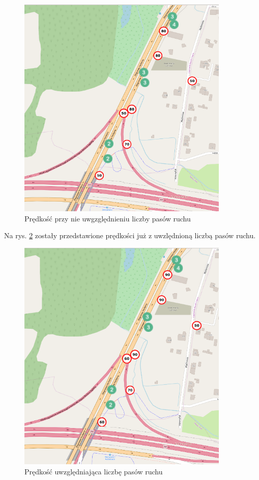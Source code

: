 \begin{figure}[h]
\caption{Prędkość przy nie uwgzględnieniu liczby pasów ruchu}
\label{sec:laneNumber}
\centering
\includegraphics[width=0.9\textwidth]{laneNumber}
\end{figure}

\newpage
Na rys. \ref{sec:laneNumberAfter} zostały przedstawione prędkości już z uwzlędnioną liczbą pasów ruchu.
\begin{figure}[h]
\caption{Prędkość uwzględniająca liczbę pasów ruchu}
\label{sec:laneNumberAfter}
\centering
\includegraphics[width=0.9\textwidth]{laneNumberAfter}
\end{figure}

